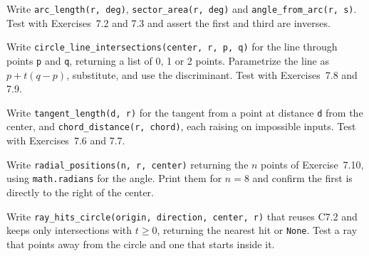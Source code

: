 \begin{codeexercises}
\item Write \lstinline!arc_length(r, deg)!, \lstinline!sector_area(r, deg)! and \lstinline!angle_from_arc(r, s)!. Test with Exercises~7.2 and 7.3 and assert the first and third are inverses.
\item Write \lstinline!circle_line_intersections(center, r, p, q)! for the line through points \lstinline!p! and \lstinline!q!, returning a list of 0, 1 or 2 points. Parametrize the line as $p + t(q - p)$, substitute, and use the discriminant. Test with Exercises~7.8 and 7.9.
\item Write \lstinline!tangent_length(d, r)! for the tangent from a point at distance \lstinline!d! from the center, and \lstinline!chord_distance(r, chord)!, each raising on impossible inputs. Test with Exercises~7.6 and 7.7.
\item Write \lstinline!radial_positions(n, r, center)! returning the $n$ points of Exercise~7.10, using \lstinline!math.radians! for the angle. Print them for $n = 8$ and confirm the first is directly to the right of the center.
\item Write \lstinline!ray_hits_circle(origin, direction, center, r)! that reuses C7.2 and keeps only intersections with $t \ge 0$, returning the nearest hit or \lstinline!None!. Test a ray that points away from the circle and one that starts inside it.
\end{codeexercises}
